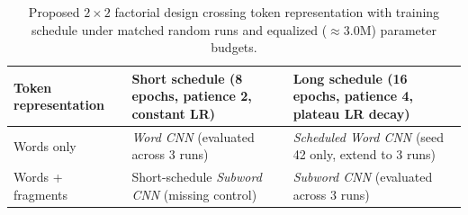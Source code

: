 \begin{table}[H]
\centering\normalsize
\begin{tabularx}{\linewidth}{@{}>{\raggedright\arraybackslash}p{36mm}>{\raggedright\arraybackslash}X>{\raggedright\arraybackslash}X@{}}
\toprule
Token representation & Short schedule (8 epochs, patience 2, constant LR) & Long schedule (16 epochs, patience 4, plateau LR decay) \\
\midrule
Words only & \textit{Word CNN} (evaluated across 3 runs) & \textit{Scheduled Word CNN} (seed 42 only, extend to 3 runs) \\
Words + fragments & Short-schedule \textit{Subword CNN} (missing control) & \textit{Subword CNN} (evaluated across 3 runs) \\
\bottomrule
\end{tabularx}
\caption[Proposed factorial CNN comparison]{Proposed $2 \times 2$ factorial design crossing token representation with training schedule under matched random runs and equalized ($\approx 3.0\mathrm{M}$) parameter budgets.}
\label{tab:proposed-cnn-design}
\end{table}

